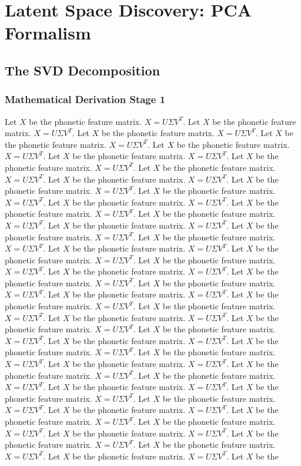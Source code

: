 \chapter{Latent Space Discovery: PCA Formalism}
\section{The SVD Decomposition}
\subsection{Mathematical Derivation Stage 1}
Let $X$ be the phonetic feature matrix. $X = U\Sigma V^T$. Let $X$ be the phonetic feature matrix. $X = U\Sigma V^T$. Let $X$ be the phonetic feature matrix. $X = U\Sigma V^T$. Let $X$ be the phonetic feature matrix. $X = U\Sigma V^T$. Let $X$ be the phonetic feature matrix. $X = U\Sigma V^T$. Let $X$ be the phonetic feature matrix. $X = U\Sigma V^T$. Let $X$ be the phonetic feature matrix. $X = U\Sigma V^T$. Let $X$ be the phonetic feature matrix. $X = U\Sigma V^T$. Let $X$ be the phonetic feature matrix. $X = U\Sigma V^T$. Let $X$ be the phonetic feature matrix. $X = U\Sigma V^T$. Let $X$ be the phonetic feature matrix. $X = U\Sigma V^T$. Let $X$ be the phonetic feature matrix. $X = U\Sigma V^T$. Let $X$ be the phonetic feature matrix. $X = U\Sigma V^T$. Let $X$ be the phonetic feature matrix. $X = U\Sigma V^T$. Let $X$ be the phonetic feature matrix. $X = U\Sigma V^T$. Let $X$ be the phonetic feature matrix. $X = U\Sigma V^T$. Let $X$ be the phonetic feature matrix. $X = U\Sigma V^T$. Let $X$ be the phonetic feature matrix. $X = U\Sigma V^T$. Let $X$ be the phonetic feature matrix. $X = U\Sigma V^T$. Let $X$ be the phonetic feature matrix. $X = U\Sigma V^T$. Let $X$ be the phonetic feature matrix. $X = U\Sigma V^T$. Let $X$ be the phonetic feature matrix. $X = U\Sigma V^T$. Let $X$ be the phonetic feature matrix. $X = U\Sigma V^T$. Let $X$ be the phonetic feature matrix. $X = U\Sigma V^T$. Let $X$ be the phonetic feature matrix. $X = U\Sigma V^T$. Let $X$ be the phonetic feature matrix. $X = U\Sigma V^T$. Let $X$ be the phonetic feature matrix. $X = U\Sigma V^T$. Let $X$ be the phonetic feature matrix. $X = U\Sigma V^T$. Let $X$ be the phonetic feature matrix. $X = U\Sigma V^T$. Let $X$ be the phonetic feature matrix. $X = U\Sigma V^T$. Let $X$ be the phonetic feature matrix. $X = U\Sigma V^T$. Let $X$ be the phonetic feature matrix. $X = U\Sigma V^T$. Let $X$ be the phonetic feature matrix. $X = U\Sigma V^T$. Let $X$ be the phonetic feature matrix. $X = U\Sigma V^T$. Let $X$ be the phonetic feature matrix. $X = U\Sigma V^T$. Let $X$ be the phonetic feature matrix. $X = U\Sigma V^T$. Let $X$ be the phonetic feature matrix. $X = U\Sigma V^T$. Let $X$ be the phonetic feature matrix. $X = U\Sigma V^T$. Let $X$ be the phonetic feature matrix. $X = U\Sigma V^T$. Let $X$ be the phonetic feature matrix. $X = U\Sigma V^T$. Let $X$ be the phonetic feature matrix. $X = U\Sigma V^T$. Let $X$ be the phonetic feature matrix. $X = U\Sigma V^T$. Let $X$ be the phonetic feature matrix. $X = U\Sigma V^T$. Let $X$ be the phonetic feature matrix. $X = U\Sigma V^T$. Let $X$ be the phonetic feature matrix. $X = U\Sigma V^T$. Let $X$ be the 